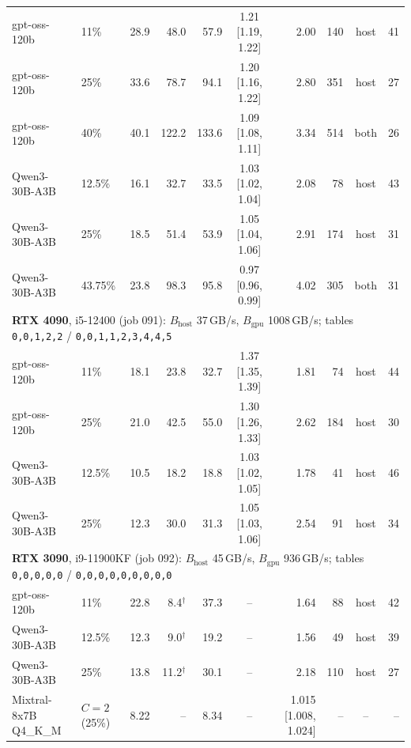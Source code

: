 \begin{table}[t]
{\begin{tabular}{llrrrcrrcr}
gpt-oss-120b & 11\% & 28.9 & 48.0 & 57.9 & 1.21 [1.19, 1.22] & 2.00 & 140 & host & 41 \\
gpt-oss-120b & 25\% & 33.6 & 78.7 & 94.1 & 1.20 [1.16, 1.22] & 2.80 & 351 & host & 27 \\
gpt-oss-120b & 40\% & 40.1 & 122.2 & 133.6 & 1.09 [1.08, 1.11] & 3.34 & 514 & both & 26 \\
Qwen3-30B-A3B & 12.5\% & 16.1 & 32.7 & 33.5 & 1.03 [1.02, 1.04] & 2.08 & 78 & host & 43 \\
Qwen3-30B-A3B & 25\% & 18.5 & 51.4 & 53.9 & 1.05 [1.04, 1.06] & 2.91 & 174 & host & 31 \\
Qwen3-30B-A3B & 43.75\% & 23.8 & 98.3 & 95.8 & 0.97 [0.96, 0.99] & 4.02 & 305 & both & 31 \\
\midrule
\multicolumn{10}{l}{\textbf{RTX 4090}, i5-12400 (job 091): $B_{\mathrm{host}}$ 37\,GB/s, $B_{\mathrm{gpu}}$ 1008\,GB/s; tables \texttt{0,0,1,2,2} / \texttt{0,0,1,1,2,3,4,4,5}} \\
gpt-oss-120b & 11\% & 18.1 & 23.8 & 32.7 & 1.37 [1.35, 1.39] & 1.81 & 74 & host & 44 \\
gpt-oss-120b & 25\% & 21.0 & 42.5 & 55.0 & 1.30 [1.26, 1.33] & 2.62 & 184 & host & 30 \\
Qwen3-30B-A3B & 12.5\% & 10.5 & 18.2 & 18.8 & 1.03 [1.02, 1.05] & 1.78 & 41 & host & 46 \\
Qwen3-30B-A3B & 25\% & 12.3 & 30.0 & 31.3 & 1.05 [1.03, 1.06] & 2.54 & 91 & host & 34 \\
\midrule
\multicolumn{10}{l}{\textbf{RTX 3090}, i9-11900KF (job 092): $B_{\mathrm{host}}$ 45\,GB/s, $B_{\mathrm{gpu}}$ 936\,GB/s; tables \texttt{0,0,0,0,0} / \texttt{0,0,0,0,0,0,0,0,0}} \\
gpt-oss-120b & 11\% & 22.8 & 8.4$^\dagger$ & 37.3 & -- & 1.64 & 88 & host & 42 \\
Qwen3-30B-A3B & 12.5\% & 12.3 & 9.0$^\dagger$ & 19.2 & -- & 1.56 & 49 & host & 39 \\
Qwen3-30B-A3B & 25\% & 13.8 & 11.2$^\dagger$ & 30.1 & -- & 2.18 & 110 & host & 27 \\
Mixtral-8x7B Q4\_K\_M & $C{=}2$ (25\%) & 8.22 & -- & 8.34 & -- & 1.015 [1.008, 1.024] & -- & -- & -- \\
\bottomrule\end{tabular}}\end{table}

